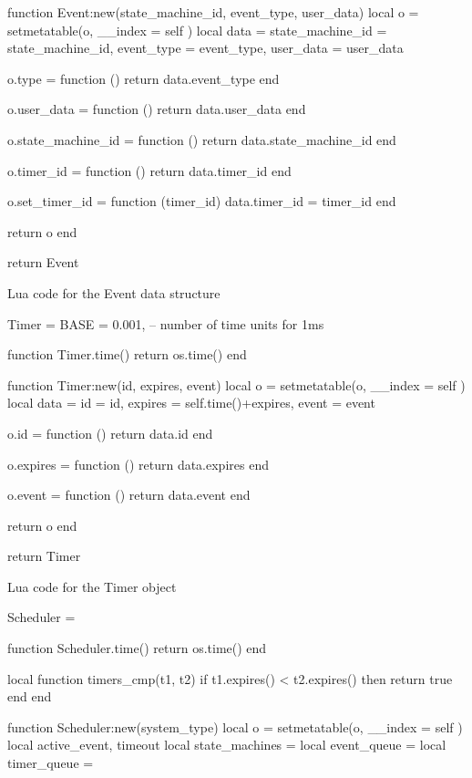 \begin{appendices}
\begin{listing}[H]
\begin{luacode}
function Event:new(state_machine_id, event_type, user_data)
	local o = {}
	setmetatable(o, { __index = self })
	local data = {state_machine_id = state_machine_id,
	              event_type = event_type, user_data = user_data}
	
	o.type = function ()
		return data.event_type
	end

	o.user_data = function ()
		return data.user_data
	end

	o.state_machine_id = function ()
		return data.state_machine_id
	end

	o.timer_id = function ()
		return data.timer_id
	end

	o.set_timer_id = function (timer_id)
		data.timer_id = timer_id
	end

	return o
end

return Event
\end{luacode}
	\caption{Lua code for the Event data structure }
	\label{code:event}
\end{listing}

\begin{listing}[H]
\begin{luacode}
Timer = {
	BASE = 0.001, -- number of time units for 1ms
}

function Timer.time()
	return os.time()
end

function Timer:new(id, expires, event)
	local o = {}
	setmetatable(o, { __index = self })
	local data = {id = id, expires = self.time()+expires, event = event}

	o.id = function ()
		return data.id
	end

	o.expires = function ()
		return data.expires
	end

	o.event = function ()
		return data.event
	end
	
	return o
end

return Timer
\end{luacode}
	\caption{Lua code for the Timer object }
	\label{code:timer}
\end{listing}

\begin{listing}[H]
\begin{luacode}
Scheduler = {}

function Scheduler.time()
	return os.time()
end

local function timers_cmp(t1, t2)
	if t1.expires() < t2.expires() then return true end
end

function Scheduler:new(system_type)
	local o = {}
	setmetatable(o, { __index = self })
	local active_event, timeout
	local state_machines = {}
	local event_queue = {}
	local timer_queue = {}


\end{luacode}
\end{listing}
\end{appendices}
